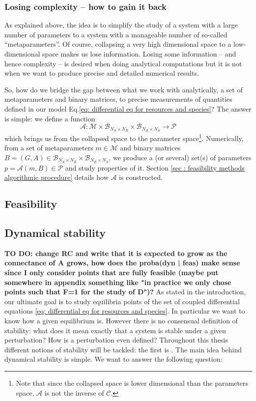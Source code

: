 \documentclass[12pt, titlepage]{report}
\begin{document}
\subsubsection{Losing complexity -- how to gain it back}
As explained above, the idea is to simplify the study of a system with a large number of parameters to a system with a manageable number of so-called ``metaparameters''. Of course, collapsing a very high dimensional space to a low-dimensional space makes us lose information. Losing some information -- and hence complexity -- is desired when doing analytical computations but it is not when we want to produce precise and detailed numerical results.

So, how do we bridge the gap between what we work with analytically, \ie a set of metaparameters and binary matrices, to precise measurements of quantities defined in our model Eq.\eqref{eq: differential eq for resources and species}? The answer is simple: we define a function
\begin{equation}
\mathcal{A}: \mathcal{M} \times \mathcal{B}_{N_S\times N_R} \times \mathcal{B}_{N_R \times N_S} \rightarrow \mathcal{P}
\end{equation}
which brings us from the collapsed space to the parameter space\footnote{Note that since the collapsed space is lower dimensional than the parameters space, $\mathcal{A}$ is not the inverse of $\mathcal{C}$.}. Numerically, from a set of metaparameters $m \in \mathcal{M}$ and binary matrices $B=(G, A) \in \mathcal{B}_{N_S \times N_R} \times \mathcal{B}_{N_R \times N_S}$, we produce a (or several) set(s) of parameters $p = \mathcal{A}(m, B) \in \mathcal{P}$ and study properties of it. Section \ref{sec : feasibility methods algorithmic procedure} details how $\mathcal{A}$ is constructed.

\subsection{Feasibility}

\subsection{Dynamical stability}
\textbf{TO DO: change RC and write that it is expected to grow as the connectance of A grows, how does the proba(dyn | feas) make sense since I only consider points that are fully feasible (maybe put somewhere in appendix something like "in practice we only chose points such that F=1 for the study of D")?}
As stated in the introduction, %
our ultimate goal is to study equilibria points of the set of coupled differential equations \eqref{eq: differential eq for resources and species}. In particular we want to know how  a given equilibrium is. However there is no consensual definition of stability: what does it mean exactly that a system is stable under a given perturbation? How is a perturbation even defined? %
Throughout this thesis different notions of stability will be tackled: the first is .
The main idea behind dynamical stability is simple. We want to answer the following question:
\end{document}
